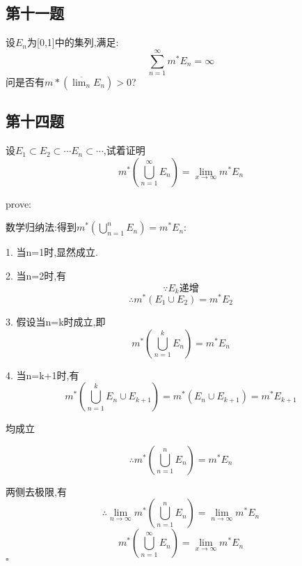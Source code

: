\documentclass[a4paper]{article}
\begin{document}
    \subsection{第十一题}
    设{$E_n$}为[0,1]中的集列,满足:
    \[\sum_{n=1}^{\infty}m^*E_n=\infty\]
    问是否有$m*(\overline{\lim_{n}}E_n)>0$?


    \subsection{第十四题}
    设$E_1\subset E_2 \subset \cdots E_n \subset \cdots$,试着证明
    \[m^{*}(\bigcup_{n=1}^{\infty}E_n)= \lim_{x\to \infty} m^{*}E_n\]

    prove:

    数学归纳法:得到$m^{*}(\bigcup_{n=1}^{n}E_n)=m^{*}E_n$:

    1. 当n=1时,显然成立.

    2. 当n=2时,有
    \[\because {E_k}\text{递增}\]
    \[\therefore m^{*}(E_1 \cup E_2)=m^*E_2\]

    3. 假设当n=k时成立,即
    \[m^{*}(\bigcup_{n=1}^{k}E_n)=m^{*}E_n\]

    4. 当n=k+1时,有
    \[m^{*}(\bigcup_{n=1}^{k}E_n \cup E_{k+1})=m^{*}(E_n\cup E_{k+1})=m^{*}E_{k+1}\]
    
    均成立

    \[\therefore m^{*}(\bigcup_{n=1}^{n}E_n)=m^{*}E_n\]

    两侧去极限,有
    \[\therefore \lim_{n\to \infty} m^{*}(\bigcup_{n=1}^{n}E_n)=\lim_{n\to \infty} m^{*}E_n\]
    \[m^{*}(\bigcup_{n=1}^{\infty}E_n)= \lim_{x\to \infty} m^{*}E_n\]
    \hfill $\square$
\end{document}
